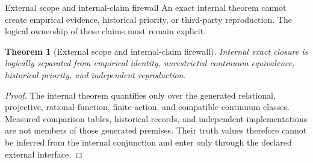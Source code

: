 \documentclass[11pt]{article}
\numberwithin{equation}{section}
\newtheorem{theorem}[definition]{Theorem}
\theoremstyle{remark}
\begin{document}
\begin{proofguide}{External scope and internal-claim firewall}
An exact internal theorem cannot create empirical evidence, historical priority, or third-party reproduction. The logical ownership of these claims must remain explicit.
\end{proofguide}
\begin{theorem}[External scope and internal-claim firewall]
Internal exact closure is logically separated from empirical identity, unrestricted continuum equivalence, historical priority, and independent reproduction.
\end{theorem}
\begin{proof}
The internal theorem quantifies only over the generated relational, projective, rational-function, finite-action, and compatible continuum classes. Measured comparison tables, historical records, and independent implementations are not members of those generated premises. Their truth values therefore cannot be inferred from the internal conjunction and enter only through the declared external interface.
\end{proof}
\end{document}
